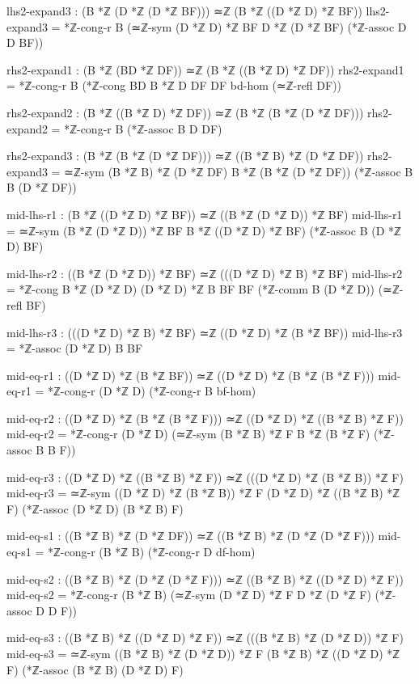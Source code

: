 \documentclass[11pt,a4paper]{book}
\begin{document}
\begin{code}
        lhs2-expand3 : (B *ℤ (D *ℤ (D *ℤ BF))) ≃ℤ (B *ℤ ((D *ℤ D) *ℤ BF))
        lhs2-expand3 = *ℤ-cong-r B (≃ℤ-sym {(D *ℤ D) *ℤ BF} {D *ℤ (D *ℤ BF)} (*ℤ-assoc D D BF))
        
        rhs2-expand1 : (B *ℤ (BD *ℤ DF)) ≃ℤ (B *ℤ ((B *ℤ D) *ℤ DF))
        rhs2-expand1 = *ℤ-cong-r B (*ℤ-cong {BD} {B *ℤ D} {DF} {DF} bd-hom (≃ℤ-refl DF))
        
        rhs2-expand2 : (B *ℤ ((B *ℤ D) *ℤ DF)) ≃ℤ (B *ℤ (B *ℤ (D *ℤ DF)))
        rhs2-expand2 = *ℤ-cong-r B (*ℤ-assoc B D DF)
        
        rhs2-expand3 : (B *ℤ (B *ℤ (D *ℤ DF))) ≃ℤ ((B *ℤ B) *ℤ (D *ℤ DF))
        rhs2-expand3 = ≃ℤ-sym {(B *ℤ B) *ℤ (D *ℤ DF)} {B *ℤ (B *ℤ (D *ℤ DF))} (*ℤ-assoc B B (D *ℤ DF))
        
        mid-lhs-r1 : (B *ℤ ((D *ℤ D) *ℤ BF)) ≃ℤ ((B *ℤ (D *ℤ D)) *ℤ BF)
        mid-lhs-r1 = ≃ℤ-sym {(B *ℤ (D *ℤ D)) *ℤ BF} {B *ℤ ((D *ℤ D) *ℤ BF)} (*ℤ-assoc B (D *ℤ D) BF)
        
        mid-lhs-r2 : ((B *ℤ (D *ℤ D)) *ℤ BF) ≃ℤ (((D *ℤ D) *ℤ B) *ℤ BF)
        mid-lhs-r2 = *ℤ-cong {B *ℤ (D *ℤ D)} {(D *ℤ D) *ℤ B} {BF} {BF} (*ℤ-comm B (D *ℤ D)) (≃ℤ-refl BF)
        
        mid-lhs-r3 : (((D *ℤ D) *ℤ B) *ℤ BF) ≃ℤ ((D *ℤ D) *ℤ (B *ℤ BF))
        mid-lhs-r3 = *ℤ-assoc (D *ℤ D) B BF
        
        mid-eq-r1 : ((D *ℤ D) *ℤ (B *ℤ BF)) ≃ℤ ((D *ℤ D) *ℤ (B *ℤ (B *ℤ F)))
        mid-eq-r1 = *ℤ-cong-r (D *ℤ D) (*ℤ-cong-r B bf-hom)
        
        mid-eq-r2 : ((D *ℤ D) *ℤ (B *ℤ (B *ℤ F))) ≃ℤ ((D *ℤ D) *ℤ ((B *ℤ B) *ℤ F))
        mid-eq-r2 = *ℤ-cong-r (D *ℤ D) (≃ℤ-sym {(B *ℤ B) *ℤ F} {B *ℤ (B *ℤ F)} (*ℤ-assoc B B F))
        
        mid-eq-r3 : ((D *ℤ D) *ℤ ((B *ℤ B) *ℤ F)) ≃ℤ (((D *ℤ D) *ℤ (B *ℤ B)) *ℤ F)
        mid-eq-r3 = ≃ℤ-sym {((D *ℤ D) *ℤ (B *ℤ B)) *ℤ F} {(D *ℤ D) *ℤ ((B *ℤ B) *ℤ F)} (*ℤ-assoc (D *ℤ D) (B *ℤ B) F)
        
        mid-eq-s1 : ((B *ℤ B) *ℤ (D *ℤ DF)) ≃ℤ ((B *ℤ B) *ℤ (D *ℤ (D *ℤ F)))
        mid-eq-s1 = *ℤ-cong-r (B *ℤ B) (*ℤ-cong-r D df-hom)
        
        mid-eq-s2 : ((B *ℤ B) *ℤ (D *ℤ (D *ℤ F))) ≃ℤ ((B *ℤ B) *ℤ ((D *ℤ D) *ℤ F))
        mid-eq-s2 = *ℤ-cong-r (B *ℤ B) (≃ℤ-sym {(D *ℤ D) *ℤ F} {D *ℤ (D *ℤ F)} (*ℤ-assoc D D F))
        
        mid-eq-s3 : ((B *ℤ B) *ℤ ((D *ℤ D) *ℤ F)) ≃ℤ (((B *ℤ B) *ℤ (D *ℤ D)) *ℤ F)
        mid-eq-s3 = ≃ℤ-sym {((B *ℤ B) *ℤ (D *ℤ D)) *ℤ F} {(B *ℤ B) *ℤ ((D *ℤ D) *ℤ F)} (*ℤ-assoc (B *ℤ B) (D *ℤ D) F)
        

\end{code}
\end{document}
